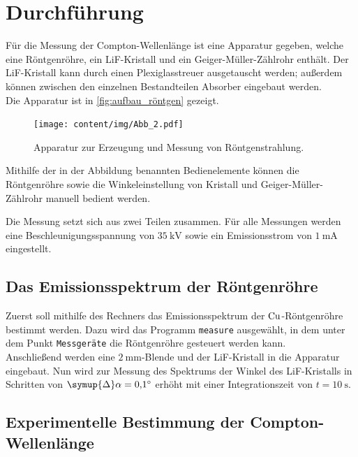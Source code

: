 \section{Durchführung}
\label{sec:durchführung}

    Für die Messung der Compton-Wellenlänge ist eine Apparatur gegeben,
    welche eine Röntgenröhre, ein LiF-Kristall und ein Geiger-Müller-Zählrohr enthält.
    Der LiF-Kristall kann durch einen Plexiglasstreuer ausgetauscht werden;
    außerdem können zwischen den einzelnen Bestandteilen Absorber eingebaut werden.\\
    Die Apparatur ist in \autoref{fig:aufbau_röntgen} gezeigt.
    \begin{figure}[H]
        \centering
        \texttt{[image: content/img/Abb\_2.pdf]}
        \caption{Apparatur zur Erzeugung und Messung von Röntgenstrahlung. \cite{versuchsanleitung}}
        \label{fig:aufbau_röntgen}
    \end{figure}
    Mithilfe der in der Abbildung benannten Bedienelemente können die Röntgenröhre
    sowie die Winkeleinstellung von Kristall und Geiger-Müller-Zählrohr
    manuell bedient werden.

    Die Messung setzt sich aus zwei Teilen zusammen.
    Für alle Messungen werden eine Beschleunigungsspannung von $\SI{35}{\kilo\volt}$
    sowie ein Emissionsstrom von $\SI{1}{\milli\ampere}$ eingestellt.


\subsection{Das Emissionsspektrum der Röntgenröhre}

    Zuerst soll mithilfe des Rechners das Emissionsspektrum der $\ce{Cu}$-Röntgenröhre bestimmt werden.
    Dazu wird das Programm \texttt{measure} ausgewählt,
    in dem unter dem Punkt \texttt{Messgeräte} die Röntgenröhre gesteuert werden kann.\\
    Anschließend werden eine $\SI{2}{\milli\meter}$-Blende und der LiF-Kristall in die Apparatur eingebaut.
    Nun wird zur Messung des Spektrums der Winkel des LiF-Kristalls in Schritten von $\symup{\Delta}\alpha = \SI{0.1}{\degree}$ erhöht mit einer Integrationszeit von $t = \SI{10}{\second}$.


\clearpage
\subsection{Experimentelle Bestimmung der Compton-Wellenlänge}

